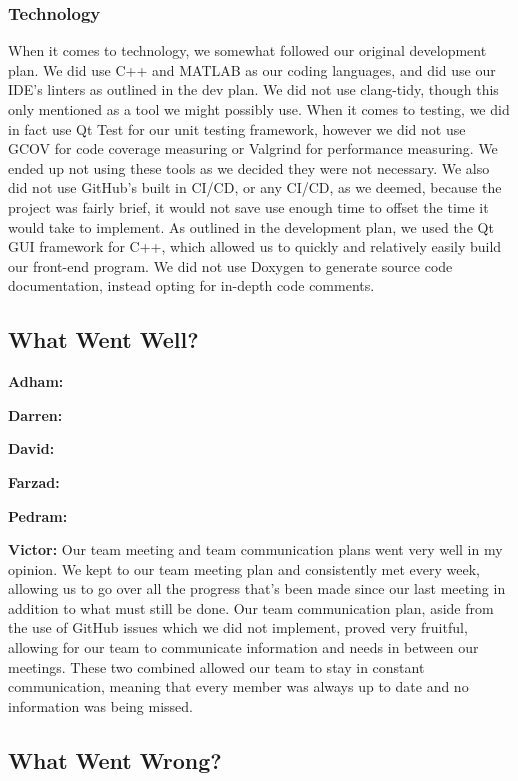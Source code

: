 \documentclass{article}
\begin{document}
\subsubsection{Technology}
When it comes to technology, we somewhat followed our original development plan. We did use C++ and MATLAB as our coding languages, and did use our IDE's linters as outlined in the dev plan. We did not use clang-tidy, though this only mentioned as a tool we might possibly use. When it comes to testing, we did in fact use Qt Test for our unit testing framework, however we did not use GCOV for code coverage measuring or Valgrind for performance measuring. We ended up not using these tools as we decided they were not necessary. We also did not use GitHub's built in CI/CD, or any CI/CD, as we deemed, because the project was fairly brief, it would not save use enough time to offset the time it would take to implement. As outlined in the development plan, we used the Qt GUI framework for C++, which allowed us to quickly and relatively easily build our front-end program. We did not use Doxygen to generate source code documentation, instead opting for in-depth code comments.

\subsection{What Went Well?}

\textbf{Adham:}

\textbf{Darren:}

\textbf{David:}

\textbf{Farzad:}

\textbf{Pedram:}

\textbf{Victor:} Our team meeting and team communication plans went very well in my opinion. We kept to our team meeting plan and consistently met every week, allowing us to go over all the progress that's been made since our last meeting in addition to what must still be done. Our team communication plan, aside from the use of GitHub issues which we did not implement, proved very fruitful, allowing for our team to communicate information and needs in between our meetings. These two combined allowed our team to stay in constant communication, meaning that every member was always up to date and no information was being missed.

\subsection{What Went Wrong?}
\end{document}
